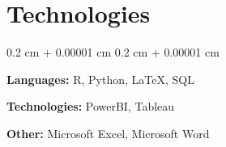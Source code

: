 \documentclass[10pt, letterpaper]{article}
\newenvironment{onecolentry}{
    \begin{adjustwidth}{
        0.2 cm + 0.00001 cm
    }{
        0.2 cm + 0.00001 cm
    }
}{
    \end{adjustwidth}
} %
\begin{document}
    
    \section{Technologies}

        
        \begin{onecolentry}
            \textbf{Languages:} R, Python, LaTeX, SQL
            
            \vspace{0.2 cm}
            
            \textbf{Technologies:} PowerBI, Tableau

            \vspace{0.2 cm}
            
            \textbf{Other:} Microsoft Excel, Microsoft Word
        \end{onecolentry}
\end{document}
